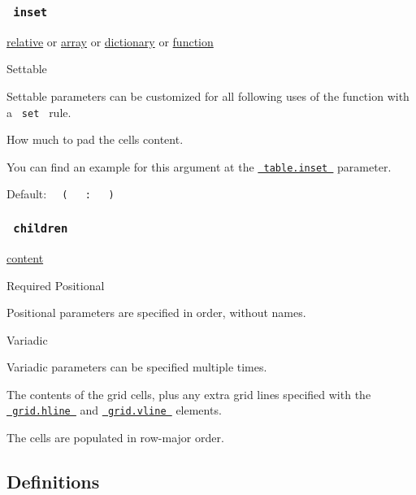 \subsubsection{\texorpdfstring{\texttt{\ inset\ }}{ inset }}\label{parameters-inset}

\href{/docs/reference/layout/relative/}{relative} {or}
\href{/docs/reference/foundations/array/}{array} {or}
\href{/docs/reference/foundations/dictionary/}{dictionary} {or}
\href{/docs/reference/foundations/function/}{function}

{{ Settable }}

\label{parameters-inset-settable-tooltip}
Settable parameters can be customized for all following uses of the
function with a \texttt{\ set\ } rule.

How much to pad the cells\textquotesingle{} content.

You can find an example for this argument at the
\href{/docs/reference/model/table/\#parameters-inset}{\texttt{\ table.inset\ }}
parameter.

Default:
\texttt{\ }{\texttt{\ (\ }}\texttt{\ }{\texttt{\ :\ }}\texttt{\ }{\texttt{\ )\ }}\texttt{\ }

\subsubsection{\texorpdfstring{\texttt{\ children\ }}{ children }}\label{parameters-children}

\href{/docs/reference/foundations/content/}{content}

{Required} {{ Positional }}

\label{parameters-children-positional-tooltip}
Positional parameters are specified in order, without names.

{{ Variadic }}

\label{parameters-children-variadic-tooltip}
Variadic parameters can be specified multiple times.

The contents of the grid cells, plus any extra grid lines specified with
the
\href{/docs/reference/layout/grid/\#definitions-hline}{\texttt{\ grid.hline\ }}
and
\href{/docs/reference/layout/grid/\#definitions-vline}{\texttt{\ grid.vline\ }}
elements.

The cells are populated in row-major order.

\subsection{\texorpdfstring{{ Definitions
}}{ Definitions }}\label{definitions}

